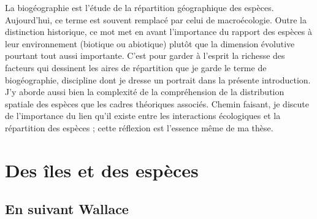 La biogéographie est l'étude de la répartition géographique des espèces.
Aujourd'hui, ce terme est souvent remplacé par celui de macroécologie.
Outre la distinction historique, ce mot met en avant l'importance du
rapport des espèces à leur environnement (biotique ou abiotique) plutôt
que la dimension évolutive pourtant tout aussi importante. C'est pour
garder à l'esprit la richesse des facteurs qui dessinent les aires de
répartition que je garde le terme de biogéographie, discipline dont je
dresse un portrait dans la présente introduction. J'y aborde aussi bien
la complexité de la compréhension de la distribution spatiale des
espèces que les cadres théoriques associés. Chemin faisant, je discute
de l'importance du lien qu'il existe entre les interactions écologiques
et la répartition des espèces ; cette réflexion est l'essence même de ma
thèse.

\section*{Des îles et des espèces}\label{des-uxeeles-et-des-espuxe8ces}

\subsection*{En suivant Wallace}\label{en-suivant-wallace}

